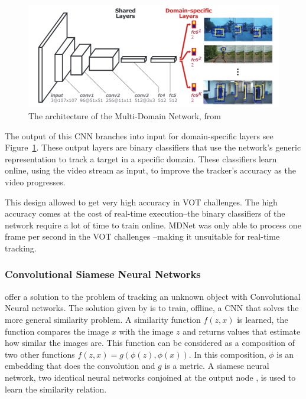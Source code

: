   \begin{figure}[!ht]
    \centering
    \includegraphics[scale=0.5]{MDNet.png}
    \caption{The architecture of the Multi-Domain Network, from \protect\cite{CNNTracking}}
    \label{fig:mdnet}
  \end{figure}
  The output of this CNN branches into input for domain-specific layers see Figure~\ref{fig:mdnet}.
  These output layers are binary classifiers that use the network's generic representation to track a target in a specific domain.
  These classifiers learn online, using the video stream as input, to improve the tracker's accuracy as the video progresses.

  This design allowed \citeauthor{CNNTracking} to get very high accuracy in VOT challenges.
  The high accuracy comes at the cost of real-time execution--the binary classifiers of the network require a lot of time to train online.
  MDNet was only able to process one frame per second in the VOT challenges \cite{bertinetto2016}--making it unsuitable for real-time tracking.
  

  \subsubsection{Convolutional Siamese Neural Networks}
  \citet{bertinetto2016} offer a solution to the problem of tracking an unknown object with Convolutional Neural networks.
  The solution given by \citeauthor{bertinetto2016} is to train, offline, a CNN that solves the more general similarity problem.
  A similarity function $f(z,x)$ is learned, the function compares the image $x$ with the image $z$ and returns values that estimate how similar the images are.
  This function can be considered as a composition of two other functions $f(z, x) = g(\phi(z), \phi(x))$.
  In this composition, $\phi$ is an embedding that does the convolution and $g$ is a metric.
  A siamese neural network, two identical neural networks conjoined at the output node \cite{bromley1993}, is used to learn the similarity relation.

